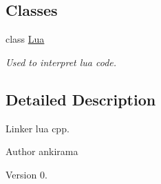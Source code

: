 \subsection*{Classes}
\begin{DoxyCompactItemize}
\item 
class \hyperlink{class_lua}{Lua}
\begin{DoxyCompactList}\small\item\em Used to interpret lua code. \end{DoxyCompactList}\end{DoxyCompactItemize}


\subsection{Detailed Description}
Linker lua cpp. 

\begin{DoxyAuthor}{Author}
ankirama 
\end{DoxyAuthor}
\begin{DoxyVersion}{Version}
0. 
\end{DoxyVersion}
